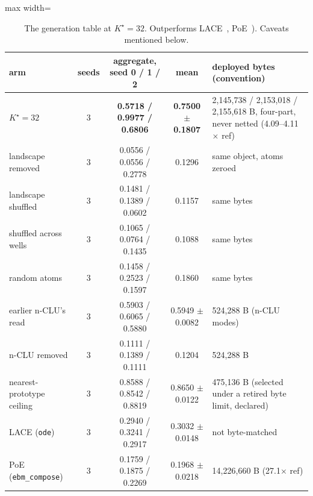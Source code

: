 \documentclass{article} %
\newcommand{\Kstar}{\ensuremath{K^{\star}}}
\begin{document}
\begin{table}[h]
\centering\scriptsize
\caption{The generation table at $\Kstar=32$. Outperforms LACE~\citep{nie_controllable_2021}, PoE~\citep{hinton_training_2002}). Caveats mentioned below.}
\label{tab:gentable-kstar}
\setlength{\tabcolsep}{2.4pt}
\begin{adjustbox}{max width=\linewidth}\begin{tabular}{lcccp{4.2cm}}
\toprule
arm & seeds & aggregate, seed 0 / 1 / 2 & mean & deployed bytes (convention) \\
\midrule
\textbf{$\Kstar=32$} & 3 & \textbf{0.5718 / 0.9977 / 0.6806} & \textbf{0.7500 $\pm$ 0.1807} & 2,145,738 / 2,153,018 / 2,155,618 B, four-part, never netted (4.09--4.11$\times$ ref) \\
\quad landscape removed & 3 & 0.0556 / 0.0556 / 0.2778 & 0.1296 & same object, atoms zeroed \\
\quad landscape shuffled & 3 & 0.1481 / 0.1389 / 0.0602 & 0.1157 & same bytes \\
\quad shuffled across wells & 3 & 0.1065 / 0.0764 / 0.1435 & 0.1088 & same bytes \\
\quad random atoms & 3 & 0.1458 / 0.2523 / 0.1597 & 0.1860 & same bytes \\
earlier n-CLU's read & 3 & 0.5903 / 0.6065 / 0.5880 & 0.5949 $\pm$ 0.0082 & 524,288 B (n-CLU modes) \\
n-CLU removed & 3 & 0.1111 / 0.1389 / 0.1111 & 0.1204 & 524,288 B \\
nearest-prototype ceiling & 3 & 0.8588 / 0.8542 / 0.8819 & 0.8650 $\pm$ 0.0122 & 475,136 B (selected under a retired byte limit, declared) \\
LACE (\texttt{ode}) & 3 & 0.2940 / 0.3241 / 0.2917 & 0.3032 $\pm$ 0.0148 & not byte-matched \\
PoE (\texttt{ebm\_compose}) & 3 & 0.1759 / 0.1875 / 0.2269 & 0.1968 $\pm$ 0.0218 & 14,226,660 B (27.1$\times$ ref) \\
\bottomrule
\end{tabular}\end{adjustbox}
\end{table}
\end{document}
